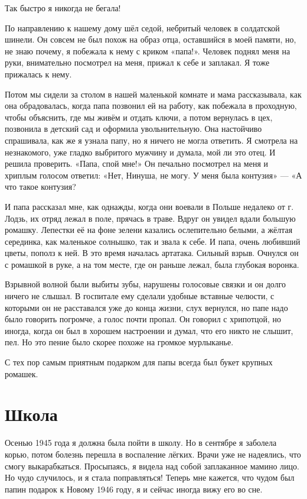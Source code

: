 Так быстро я никогда не бегала!

По направлению к нашему дому шёл седой, небритый человек в солдатской шинели.
Он совсем не был похож на образ отца, оставшийся в моей памяти, но, не знаю почему, я побежала к нему с криком «папа!».
Человек поднял меня на руки, внимательно посмотрел на меня, прижал к себе и заплакал.
Я тоже прижалась к нему.

Потом мы сидели за столом в нашей маленькой комнате и мама рассказывала, как она обрадовалась, когда папа позвонил ей на работу, как побежала в проходную, чтобы объяснить, где мы живём и отдать ключи, а потом вернулась в цех, позвонила в детский сад и оформила увольнительную.
Она настойчиво спрашивала, как же я узнала папу, но я ничего не могла ответить.
Я смотрела на незнакомого, уже гладко выбритого мужчину и думала, мой ли это отец.
И решила проверить.
«Папа, спой мне!» 
Он печально посмотрел на меня и хриплым голосом ответил: 
«Нет, Нинуша, не могу.
У меня была контузия» ---
«А что такое контузия?

И папа рассказал мне, как однажды, когда они воевали в Польше недалеко от г. Лодзь, их отряд лежал в поле, прячась в траве.
Вдруг он увидел вдали большую ромашку.
Лепестки её на фоне зелени казались ослепительно белыми, а жёлтая серединка, как маленькое солнышко, так и звала к себе.
И папа, очень любивший цветы, пополз к ней.
В это время началась артатака.
Сильный взрыв.
Очнулся он с ромашкой в руке, а на том месте, где он раньше лежал, была глубокая воронка.

Взрывной волной были выбиты зубы, нарушены голосовые связки и он долго ничего не слышал.
В госпитале ему сделали удобные вставные челюсти, с которыми он не расставался уже до конца жизни, слух вернулся, но папе надо было говорить погромче, а голос почти пропал.
Он говорил с хрипотцой, но иногда, когда он был в хорошем настроении и думал, что его никто не слышит, пел.
Но это пение было скорее похоже на громкое мурлыканье.

С тех пор самым приятным подарком для папы всегда был букет крупных ромашек.

\section*{Школа}


Осенью 1945 года я должна была пойти в школу.
Но в сентябре я заболела корью, потом болезнь перешла в воспаление лёгких.
Врачи уже не надеялись, что смогу выкарабкаться.
Просыпаясь, я видела над собой заплаканное мамино лицо.
Но чудо случилось, и я стала поправляться! 
Теперь мне кажется, что чудом был папин подарок к Новому 1946 году, я и сейчас иногда вижу его во сне.

